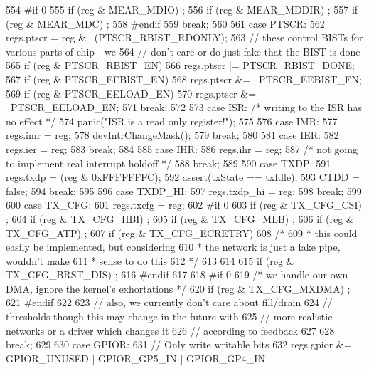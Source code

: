 \begin{DoxyCode}
{{{554 #if 0
555             if (reg & MEAR_MDIO) ;
556             if (reg & MEAR_MDDIR) ;
557             if (reg & MEAR_MDC) ;
558 #endif
559             break;
560 
561           case PTSCR:
562             regs.ptscr = reg & ~(PTSCR_RBIST_RDONLY);
563             // these control BISTs for various parts of chip - we
564             // don't care or do just fake that the BIST is done
565             if (reg & PTSCR_RBIST_EN)
566                 regs.ptscr |= PTSCR_RBIST_DONE;
567             if (reg & PTSCR_EEBIST_EN)
568                 regs.ptscr &= ~PTSCR_EEBIST_EN;
569             if (reg & PTSCR_EELOAD_EN)
570                 regs.ptscr &= ~PTSCR_EELOAD_EN;
571             break;
572 
573           case ISR: /* writing to the ISR has no effect */
574             panic("ISR is a read only register!\n");
575 
576           case IMR:
577             regs.imr = reg;
578             devIntrChangeMask();
579             break;
580 
581           case IER:
582             regs.ier = reg;
583             break;
584 
585           case IHR:
586             regs.ihr = reg;
587             /* not going to implement real interrupt holdoff */
588             break;
589 
590           case TXDP:
591             regs.txdp = (reg & 0xFFFFFFFC);
592             assert(txState == txIdle);
593             CTDD = false;
594             break;
595 
596           case TXDP_HI:
597             regs.txdp_hi = reg;
598             break;
599 
600           case TX_CFG:
601             regs.txcfg = reg;
602 #if 0
603             if (reg & TX_CFG_CSI) ;
604             if (reg & TX_CFG_HBI) ;
605             if (reg & TX_CFG_MLB) ;
606             if (reg & TX_CFG_ATP) ;
607             if (reg & TX_CFG_ECRETRY) {
608                 /*
609                  * this could easily be implemented, but considering
610                  * the network is just a fake pipe, wouldn't make
611                  * sense to do this
612                  */
613             }
614 
615             if (reg & TX_CFG_BRST_DIS) ;
616 #endif
617 
618 #if 0
619             /* we handle our own DMA, ignore the kernel's exhortations */
620             if (reg & TX_CFG_MXDMA) ;
621 #endif
622 
623             // also, we currently don't care about fill/drain
624             // thresholds though this may change in the future with
625             // more realistic networks or a driver which changes it
626             // according to feedback
627 
628             break;
629 
630           case GPIOR:
631             // Only write writable bits
632             regs.gpior &= GPIOR_UNUSED | GPIOR_GP5_IN | GPIOR_GP4_IN
}}}
\end{DoxyCode}
